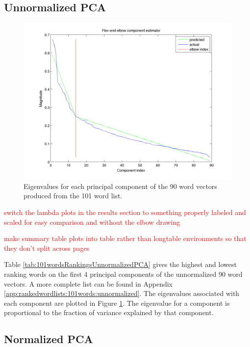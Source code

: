 \documentclass[10pt,letterpaper]{book}
\newcommand{\todo}[1]{\textcolor{red}{#1}}
\begin{document}
\subsection{Unnormalized PCA}



\begin{figure}[!htbp]
    \includegraphics[width=0.9\linewidth]{100words-adj-800dim-lowercase_wmt_model-original-flex_end_elbow}
    \caption{Eigenvalues for each principal component of the 90 word vectors
    produced from the 101 word list.}
    \label{fig:101wordsunnormalizedpcaeigenvalues}
\end{figure}

\todo{switch the lambda plots in the results section to something properly labeled and scaled for easy comparison and without the elbow drawing}

\todo{make summary table plots into table rather than longtable environments so that they don't split across pages}

Table \ref{tab:101wordsRankingsUnnormalizedPCA} gives the highest and lowest
ranking words on the first 4 principal components of the unnormalized 90 word 
vectors. A more complete list can be found in Appendix 
\ref{app:rankedwordlists:101words:unnormalized}. The eigenvalues associated 
with each component are plotted in Figure 
\ref{fig:101wordsunnormalizedpcaeigenvalues}. The eigenvalue for a component is
proportional to the fraction of variance explained by that component.


\subsection{Normalized PCA}
\end{document}
